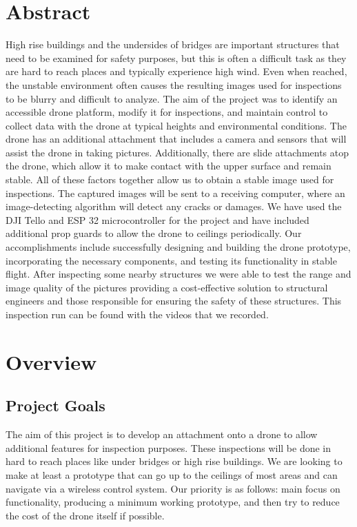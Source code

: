 \documentclass[12pt]{article}
\begin{document}
    \section{Abstract}
        High rise buildings and the undersides of bridges are important structures that need to be examined for safety purposes, but this is often a difficult task as they are hard to reach places and typically experience high wind.
        Even when reached, the unstable environment often causes the resulting images used for inspections to be blurry and difficult to analyze.
        The aim of the project was to identify an accessible drone platform, modify it for inspections, and maintain control to collect data with the drone at typical heights and environmental conditions.
        The drone has an additional attachment that includes a camera and sensors that will assist the drone in taking pictures.
        Additionally, there are slide attachments atop the drone, which allow it to make contact with the upper surface and remain stable.
        All of these factors together allow us to obtain a stable image used for inspections.
        The captured images will be sent to a receiving computer, where an image-detecting algorithm will detect any cracks or damages.
        We have used the DJI Tello and ESP 32 microcontroller for the project and have included additional prop guards to allow the drone to ceilings periodically.
        Our accomplishments include successfully designing and building the drone prototype, incorporating the necessary components, and testing its functionality in stable flight.
        After inspecting some nearby structures we were able to test the range and image quality of the pictures providing a cost-effective solution to structural engineers and those responsible for ensuring the safety of these structures.
        This inspection run can be found with the videos that we recorded.
    
    \newpage
    \section{Overview}

        \subsection{Project Goals}
            The aim of this project is to develop an attachment onto a drone to allow additional features for inspection purposes.
            These inspections will be done in hard to reach places like under bridges or high rise buildings.
            We are looking to make at least a prototype that can go up to the ceilings of most areas and can navigate via a wireless control system.
            Our priority is as follows: main focus on functionality, producing a minimum working prototype, and then try to reduce the cost of the drone itself if possible.
\end{document}
